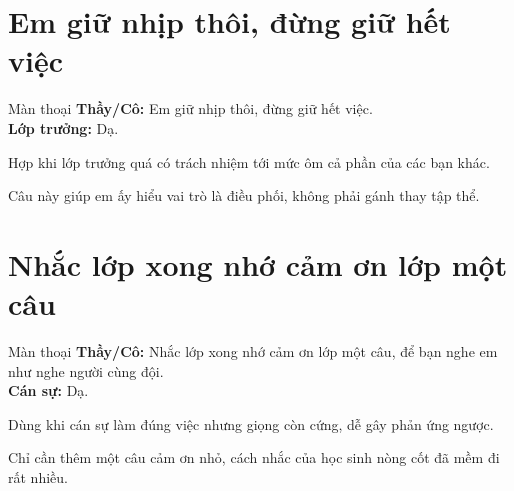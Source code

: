 \section{Em giữ nhịp thôi, đừng giữ hết việc}
\begin{manthoai}{Màn thoại}
\textbf{Thầy/Cô:} Em giữ nhịp thôi, đừng giữ hết việc.\\
\textbf{Lớp trưởng:} Dạ.
\end{manthoai}
\begin{dungkhinào}
Hợp khi lớp trưởng quá có trách nhiệm tới mức ôm cả phần của các bạn khác.
\end{dungkhinào}
\begin{nhipthem}
Câu này giúp em ấy hiểu vai trò là điều phối, không phải gánh thay tập thể.
\end{nhipthem}
\ngancach

\section{Nhắc lớp xong nhớ cảm ơn lớp một câu}
\begin{manthoai}{Màn thoại}
\textbf{Thầy/Cô:} Nhắc lớp xong nhớ cảm ơn lớp một câu, để bạn nghe em như nghe người cùng đội.\\
\textbf{Cán sự:} Dạ.
\end{manthoai}
\begin{dungkhinào}
Dùng khi cán sự làm đúng việc nhưng giọng còn cứng, dễ gây phản ứng ngược.
\end{dungkhinào}
\begin{nhipthem}
Chỉ cần thêm một câu cảm ơn nhỏ, cách nhắc của học sinh nòng cốt đã mềm đi rất nhiều.
\end{nhipthem}
